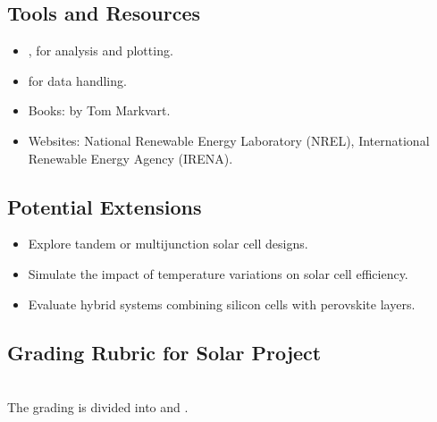\documentclass[letterpaper,10pt,english]{jupyterBook}
\begin{document}
\subsection{Tools and Resources}
\label{\detokenize{ProjectInstructions:tools-and-resources}}
\sphinxAtStartPar
{}
\begin{itemize}
\item {} 
\sphinxAtStartPar
{},  for analysis and plotting.

\item {} 
\sphinxAtStartPar
{} for data handling.

\end{itemize}

\sphinxAtStartPar
{}
\begin{itemize}
\item {} 
\sphinxAtStartPar
Books:  by Tom Markvart.

\item {} 
\sphinxAtStartPar
Websites: National Renewable Energy Laboratory (NREL), International
Renewable Energy Agency (IRENA).

\end{itemize}


\subsection{Potential Extensions}
\label{\detokenize{ProjectInstructions:potential-extensions}}\begin{itemize}
\item {} 
\sphinxAtStartPar
Explore tandem or multi\sphinxhyphen{}junction solar cell designs.

\item {} 
\sphinxAtStartPar
Simulate the impact of temperature variations on solar cell
efficiency.

\item {} 
\sphinxAtStartPar
Evaluate hybrid systems combining silicon cells with perovskite
layers.

\end{itemize}


\subsection{Grading Rubric for Solar Project}
\label{\detokenize{ProjectInstructions:grading-rubric-for-solar-project}}
\sphinxAtStartPar
{}\\
The grading is divided into  and .
\end{document}
